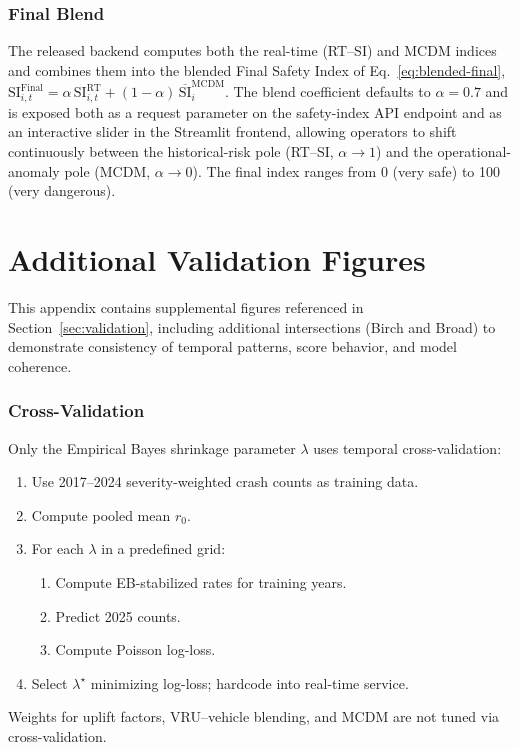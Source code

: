 \documentclass[conference]{IEEEtran}
\begin{document}
\subsubsection{Final Blend}
The released backend computes both the real-time (RT--SI) and MCDM indices and
combines them into the blended Final Safety Index of
Eq.~\eqref{eq:blended-final},
$\mathrm{SI}^{\text{Final}}_{i,t} = \alpha\,\mathrm{SI}^{\text{RT}}_{i,t} +
(1-\alpha)\,\overline{\mathrm{SI}}^{\text{MCDM}}_i$.
The blend coefficient defaults to $\alpha = 0.7$ and is exposed both as a
request parameter on the safety-index API endpoint and as an interactive
slider in the Streamlit frontend, allowing operators to shift continuously
between the historical-risk pole (RT--SI, $\alpha\!\to\!1$) and the
operational-anomaly pole (MCDM, $\alpha\!\to\!0$). The final index ranges from
0 (very safe) to 100 (very dangerous).

\section{Additional Validation Figures}
\label{appendix:validation}

This appendix contains supplemental figures referenced in
Section~\ref{sec:validation}, including additional intersections (Birch and Broad)
to demonstrate consistency of temporal patterns, score behavior, and model coherence.

\subsubsection{Cross-Validation}
Only the Empirical Bayes shrinkage parameter $\lambda$ uses temporal 
cross-validation:
\begin{enumerate}
\item Use 2017--2024 severity-weighted crash counts as training data.
\item Compute pooled mean $r_0$.
\item For each $\lambda$ in a predefined grid:
    \begin{enumerate}
        \item Compute EB-stabilized rates for training years.
        \item Predict 2025 counts.
        \item Compute Poisson log-loss.
    \end{enumerate}
\item Select $\lambda^\star$ minimizing log-loss; hardcode into real-time service.
\end{enumerate}
Weights for uplift factors, VRU--vehicle blending, and MCDM are not tuned via 
cross-validation.
\end{document}

